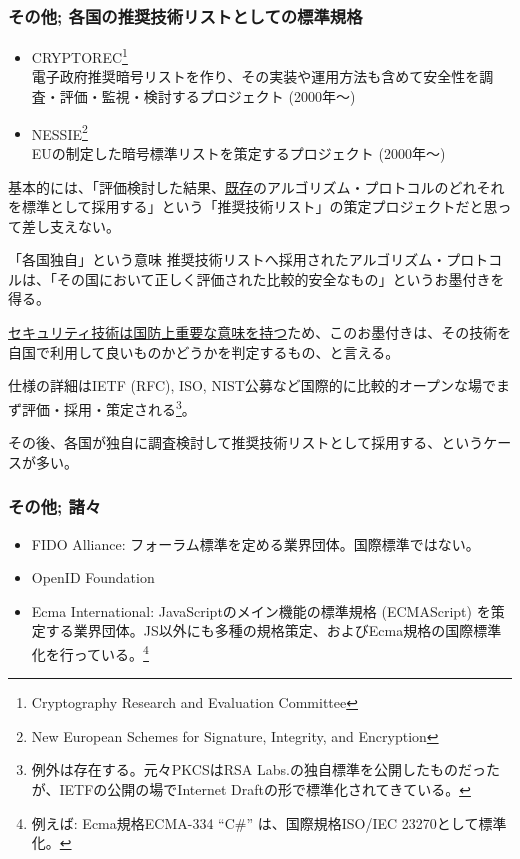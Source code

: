 \documentclass[12pt,dvipdfmx]{beamer}
\begin{document}
\begin{frame}
\frametitle{その他; 各国の推奨技術リストとしての標準規格}
\small
\begin{itemize}
 \item CRYPTOREC\footnote[frame]{\scriptsize Cryptography Research and Evaluation Committee} \\
電子政府推奨暗号リストを作り、その実装や運用方法も含めて安全性を調査・評価・監視・検討するプロジェクト (2000年〜)
 \item NESSIE\footnote[frame]{\scriptsize New European Schemes for Signature, Integrity, and Encryption}\\
EUの制定した暗号標準リストを策定するプロジェクト (2000年〜)
\end{itemize}
基本的には、「評価検討した結果、\underline{既存}のアルゴリズム・プロトコルのどれそれを標準として採用する」という\alert{「推奨技術リスト」の策定プロジェクト}だと思って差し支えない。
\end{frame}

\begin{frame}
\small
 
\begin{block}{\small 「各国独自」という意味}
推奨技術リストへ採用されたアルゴリズム・プロトコルは、「その国において正しく評価された比較的安全なもの」というお墨付きを得る。


\underline{セキュリティ技術は国防上重要な意味を持つ}ため、このお墨付きは、その技術を自国で利用して良いものかどうかを判定するもの、と言える。
\end{block}

仕様の詳細はIETF (RFC), ISO, NIST公募など国際的に比較的オープンな場でまず評価・採用・策定される\footnote[frame]{\scriptsize 例外は存在する。元々PKCSはRSA Labs.の独自標準を公開したものだったが、IETFの公開の場でInternet Draftの形で標準化されてきている。}。

\vspace{1ex}

その後、各国が独自に調査検討して推奨技術リストとして採用する、というケースが多い。

\end{frame}

\begin{frame}
\frametitle{その他; 諸々}
\begin{itemize}
 \item FIDO Alliance: フォーラム標準を定める業界団体。国際標準ではない。
 \item OpenID Foundation
 \item Ecma International: JavaScriptのメイン機能の標準規格 (ECMAScript) を策定する業界団体。JS以外にも多種の規格策定、およびEcma規格の国際標準化を行っている。\footnote[frame]{\scriptsize 例えば: Ecma規格ECMA-334 ``C\#'' は、国際規格ISO/IEC 23270として標準化。}
\end{itemize}
\end{frame}
\end{document}
